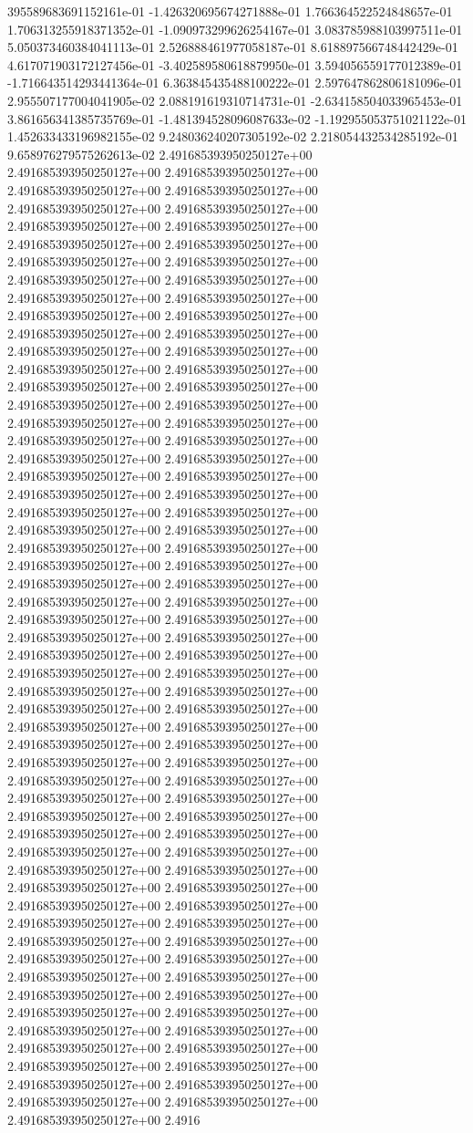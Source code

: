 395589683691152161e-01	-1.426320695674271888e-01	1.766364522524848657e-01	1.706313255918371352e-01	-1.090973299626254167e-01	3.083785988103997511e-01	5.050373460384041113e-01	2.526888461977058187e-01	8.618897566748442429e-01	4.617071903172127456e-01	-3.402589580618879950e-01	3.594056559177012389e-01	-1.716643514293441364e-01	6.363845435488100222e-01	2.597647862806181096e-01	2.955507177004041905e-02	2.088191619310714731e-01	-2.634158504033965453e-01	3.861656341385735769e-01	-1.481394528096087633e-02	-1.192955053751021122e-01	1.452633433196982155e-02	9.248036240207305192e-02	2.218054432534285192e-01	9.658976279575262613e-02
2.491685393950250127e+00	2.491685393950250127e+00	2.491685393950250127e+00	2.491685393950250127e+00	2.491685393950250127e+00	2.491685393950250127e+00	2.491685393950250127e+00	2.491685393950250127e+00	2.491685393950250127e+00	2.491685393950250127e+00	2.491685393950250127e+00	2.491685393950250127e+00	2.491685393950250127e+00	2.491685393950250127e+00	2.491685393950250127e+00	2.491685393950250127e+00	2.491685393950250127e+00	2.491685393950250127e+00	2.491685393950250127e+00	2.491685393950250127e+00	2.491685393950250127e+00	2.491685393950250127e+00	2.491685393950250127e+00	2.491685393950250127e+00	2.491685393950250127e+00	2.491685393950250127e+00	2.491685393950250127e+00	2.491685393950250127e+00	2.491685393950250127e+00	2.491685393950250127e+00	2.491685393950250127e+00	2.491685393950250127e+00	2.491685393950250127e+00	2.491685393950250127e+00	2.491685393950250127e+00	2.491685393950250127e+00	2.491685393950250127e+00	2.491685393950250127e+00	2.491685393950250127e+00	2.491685393950250127e+00	2.491685393950250127e+00	2.491685393950250127e+00	2.491685393950250127e+00	2.491685393950250127e+00	2.491685393950250127e+00	2.491685393950250127e+00	2.491685393950250127e+00	2.491685393950250127e+00	2.491685393950250127e+00	2.491685393950250127e+00	2.491685393950250127e+00	2.491685393950250127e+00	2.491685393950250127e+00	2.491685393950250127e+00	2.491685393950250127e+00	2.491685393950250127e+00	2.491685393950250127e+00	2.491685393950250127e+00	2.491685393950250127e+00	2.491685393950250127e+00	2.491685393950250127e+00	2.491685393950250127e+00	2.491685393950250127e+00	2.491685393950250127e+00	2.491685393950250127e+00	2.491685393950250127e+00	2.491685393950250127e+00	2.491685393950250127e+00	2.491685393950250127e+00	2.491685393950250127e+00	2.491685393950250127e+00	2.491685393950250127e+00	2.491685393950250127e+00	2.491685393950250127e+00	2.491685393950250127e+00	2.491685393950250127e+00	2.491685393950250127e+00	2.491685393950250127e+00	2.491685393950250127e+00	2.491685393950250127e+00	2.491685393950250127e+00	2.491685393950250127e+00	2.491685393950250127e+00	2.491685393950250127e+00	2.491685393950250127e+00	2.491685393950250127e+00	2.491685393950250127e+00	2.491685393950250127e+00	2.491685393950250127e+00	2.491685393950250127e+00	2.491685393950250127e+00	2.491685393950250127e+00	2.491685393950250127e+00	2.491685393950250127e+00	2.491685393950250127e+00	2.491685393950250127e+00	2.491685393950250127e+00	2.491685393950250127e+00	2.491685393950250127e+00	2.491685393950250127e+00	2.491685393950250127e+00	2.491685393950250127e+00	2.491685393950250127e+00	2.491685393950250127e+00	2.491685393950250127e+00	2.491685393950250127e+00	2.491685393950250127e+00	2.491685393950250127e+00	2.4916